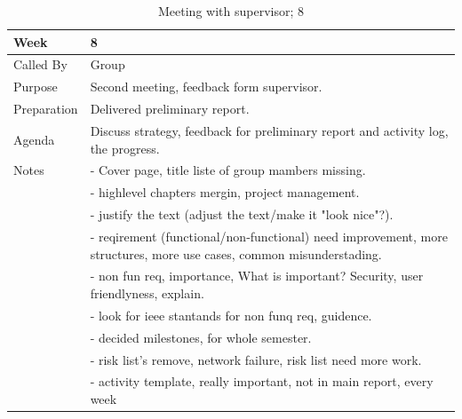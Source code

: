 {\footnotesize
\begin{table}[H]
\begin{tabular}{| p{5cm} | p{10cm} |}\hline
	\textbf{Week}	& \textbf{8} \\ \hline
	Called	By		& Group\\ \hline
	Purpose		& Second meeting, feedback form supervisor.\\ \hline
	Preparation 
		& Delivered preliminary report.\\ 
		
	Agenda
		& Discuss strategy, feedback for preliminary report and activity log, the progress. \\

	Notes	& - Cover page, title liste of group mambers missing.\\
& - highlevel chapters mergin, project management.\\
& - justify the text (adjust the text/make it "look nice"?).\\
& - reqirement (functional/non-functional) need improvement, more structures, more use cases, common misunderstading.\\
& - non fun req, importance, What is important? Security, user friendlyness, explain.\\
& - look for ieee stantands for non funq req, guidence.\\
& - decided milestones, for whole semester.\\
& - risk list's remove, network failure, risk list need more work.\\
& - activity template, really important, not in main report, every week \\ \hline
	
\end{tabular}


\caption{Meeting with supervisor; 8}
\label{fig:s_meeting_8}
\end{table}}


